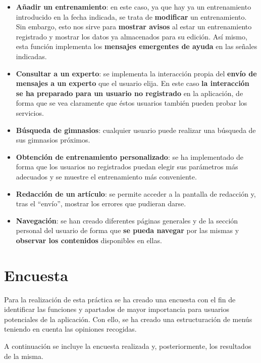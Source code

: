 \documentclass[a4paper]{article}
\begin{document}
\begin{itemize}
	\item   \textbf{Añadir un entrenamiento}: en este caso, ya que hay ya un entrenamiento introducido en la fecha indicada, se trata de \textbf{modificar} un entrenamiento. Sin embargo, esto nos sirve para \textbf{mostrar avisos} al estar un entrenamiento registrado y mostrar los datos ya almacenados para su edición. Así mismo, esta función implementa los \textbf{mensajes emergentes de ayuda} en las señales indicadas.
	
	\item   \textbf{Consultar a un experto}: se implementa la interacción propia del \textbf{envío de mensajes a un experto} que el usuario elija. En este caso \textbf{la interacción se ha preparado para un usuario no registrado} en la aplicación, de forma que se vea claramente que éstos usuarios también pueden probar los servicios.
	
	\item   \textbf{Búsqueda de gimnasios}: cualquier usuario puede realizar una búsqueda de sus gimnasios próximos.
	
	\item   \textbf{Obtención de entrenamiento personalizado}: se ha implementado de forma que los usuarios no registrados puedan elegir sus parámetros más adecuados y se muestre el entrenamiento más conveniente.
	
	\item   \textbf{Redacción de un artículo}: se permite acceder a la pantalla de redacción y, tras el ``envío'', mostrar los errores que pudieran darse.
	
	\item   \textbf{Navegación}: se han creado diferentes páginas generales y de la sección personal del usuario de forma que \textbf{se pueda navegar} por las mismas y \textbf{observar los contenidos} disponibles en ellas.
\end{itemize}

\section{Encuesta}
 Para la realización de esta práctica se ha creado una encuesta con el fin de identificar las funciones y apartados de mayor importancia para usuarios potenciales de la aplicación. Con ello, se ha creado una estructuración de menús teniendo en cuenta las opiniones recogidas.
 
 A continuación se incluye la encuesta realizada y, posteriormente, los resultados de la misma.
 
\end{document}
